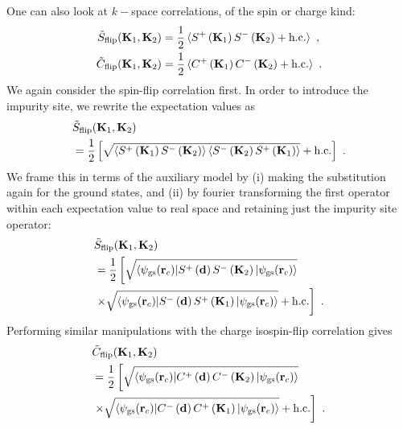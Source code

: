 \documentclass[reprint,hidelinks]{revtex4-2}
\begin{document}
One can also look at \(k-\)space correlations, of the spin or charge kind:
\begin{equation}\begin{aligned}
	\tilde{S}_\text{flip}({\bf K}_1, {\bf K}_2) &= \frac{1}{2}\braket{S^+\left({\bf K}_1\right)S^-\left({\bf K}_2\right) + \text{h.c.}}~,\\
	\tilde{C}_\text{flip}({\bf K}_1, {\bf K}_2) &= \frac{1}{2}\braket{C^+\left({\bf K}_1\right)C^-\left({\bf K}_2\right) + \text{h.c.}}~.
\end{aligned}\end{equation}
We again consider the spin-flip correlation first. In order to introduce the impurity site, we rewrite the expectation values as
\begin{equation}\begin{aligned}
	&\tilde{S}_\text{flip}({\bf K}_1, {\bf K}_2) \\
	&= \frac{1}{2}\left[\sqrt{\braket{S^+\left({\bf K}_1\right)S^-\left({\bf K}_2\right)}\braket{S^-\left({\bf K}_2\right)S^+\left({\bf K}_1\right)}} + \text{h.c.}\right] ~.
\end{aligned}\end{equation}
We frame this in terms of the auxiliary model by (i) making the substitution again for the ground states, and (ii) by fourier transforming the first operator within each expectation value to real space and retaining just the impurity site operator:
\begin{equation}\begin{aligned}
	&\tilde{S}_\text{flip}({\bf K}_1, {\bf K}_2) \\
	&= \frac{1}{2}\left[\sqrt{\braket{\psi_\text{gs}({\bf r}_c) | S^+\left({\bf d}\right)S^-\left({\bf K}_2\right) | \psi_\text{gs}({\bf r}_c)}}\right. \\
	&\left.\times\sqrt{\braket{\psi_\text{gs}{({\bf r}_c)} | S^-\left({\bf d}\right)S^+\left({\bf K}_1\right) | \psi_\text{gs}{({\bf r}_c)}}} + \text{h.c.}\right] ~.
\end{aligned}\end{equation}
Performing similar manipulations with the charge isospin-flip correlation gives
\begin{equation}\begin{aligned}
	&\tilde{C}_\text{flip}({\bf K}_1, {\bf K}_2) \\
	&= \frac{1}{2}\left[\sqrt{\braket{\psi_\text{gs}({\bf r}_c) | C^+\left({\bf d}\right)C^-\left({\bf K}_2\right) | \psi_\text{gs}({\bf r}_c)}}\right. \\
	&\left.\times\sqrt{\braket{\psi_\text{gs}{({\bf r}_c)} | C^-\left({\bf d}\right)C^+\left({\bf K}_1\right) | \psi_\text{gs}{({\bf r}_c)}}} + \text{h.c.}\right] ~.
\end{aligned}\end{equation}
\end{document}
